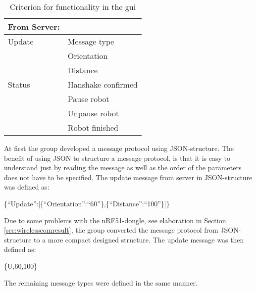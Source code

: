 \begin{table}[ht]
\begin{center}
 \begin{tabular}{|l | l|} 
 \hline
 From Server: & \\
 \hline
 Update  			&   Message type \\
                    &   Orientation \\
                    &   Distance \\
 \hline
 Status		        &   Hanshake confirmed \\
                    &   Pause robot \\
                    &   Unpause robot \\
                    &   Robot finished \\
 \hline
\end{tabular}
\end{center}
\caption{Criterion for functionality in the \acrshort{gui}}
\label{tab:messprotfromser}
\end{table}

At first the group developed a message protocol using JSON-structure. The benefit of using JSON to structure a message protocol, is that it is easy to understand just by reading the message as well as the order of the parameters does not have to be specified. The update message from server in JSON-structure was defined as:

\{``Update'':[\{``Orientation'':``60''\},\{``Distance'':``100''\}]\}

Due to some problems with the nRF51-dongle, see elaboration in Section \ref{sec:wirelesscomresult}, the group converted the message protocol from JSON-structure to a more compact designed structure. The update message was then defined as:

\{U,60,100\}

The remaining message types were defined in the same manner.